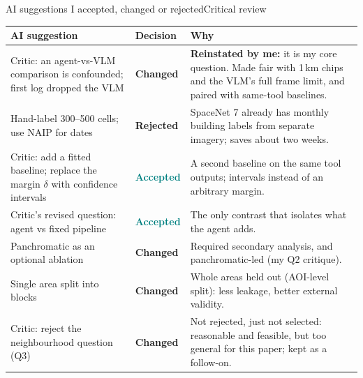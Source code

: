 \documentclass[aspectratio=169,11pt]{beamer}
\newcommand{\acc}{\textcolor{teal}{\textbf{Accepted}}}
\newcommand{\chg}{\textcolor{amber}{\textbf{Changed}}}
\newcommand{\rej}{\textcolor{failred}{\textbf{Rejected}}}
\begin{document}
\begin{frame}[shrink=10]{AI suggestions I accepted, changed or rejected}{Critical review}
\footnotesize
\begin{tabularx}{\textwidth}{@{}p{4.6cm}p{1.6cm}Y@{}}
\toprule
\textbf{AI suggestion} & \textbf{Decision} & \textbf{Why} \\
\midrule
Critic: an agent-vs-VLM comparison is confounded; first log dropped the VLM & \chg & \textbf{Reinstated by me:} it is my core question. Made fair with 1\,km chips and the VLM's full frame limit, and paired with same-tool baselines. \\
Hand-label 300--500 cells; use NAIP for dates & \rej & SpaceNet 7 already has monthly building labels from separate imagery; saves about two weeks. \\
Critic: add a fitted baseline; replace the margin $\delta$ with confidence intervals & \acc & A second baseline on the same tool outputs; intervals instead of an arbitrary margin. \\
Critic's revised question: agent vs fixed pipeline & \acc & The only contrast that isolates what the agent adds. \\
Panchromatic as an optional ablation & \chg & Required secondary analysis, and panchromatic-led (my Q2 critique). \\
Single area split into blocks & \chg & Whole areas held out (AOI-level split): less leakage, better external validity. \\
Critic: reject the neighbourhood question (Q3) & \chg & Not rejected, just not selected: reasonable and feasible, but too general for this paper; kept as a follow-on. \\
\bottomrule
\end{tabularx}
\end{frame}
\end{document}
